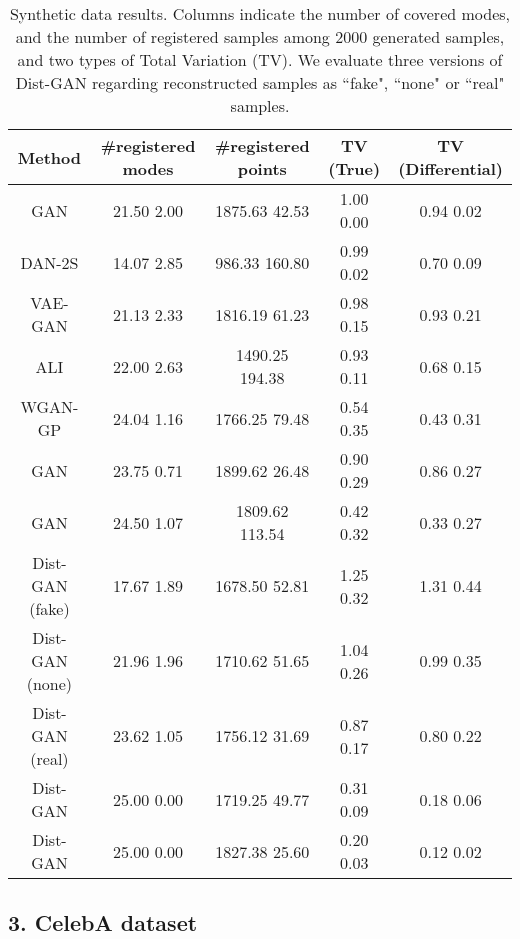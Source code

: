 \documentclass[runningheads]{llncs}
\begin{document}
\begin{table*}
\centering
\footnotesize
\caption{Synthetic data results. Columns indicate the number of covered modes, and the number of registered samples among 2000 generated samples, and two types of Total Variation (TV). We evaluate three versions of Dist-GAN regarding reconstructed samples as ``fake", ``none" or ``real" samples.}
\begin{tabular}{c | c | c | c | c}
Method & \#registered modes & \#registered points & TV (True) & TV (Differential) \\ 
\hline
\hline
GAN \cite{goodfellow-nisp-2014}     & 21.50  2.00     & 1875.63  42.53  & 1.00  0.00 & 0.94  0.02  \\
\hline
DAN-2S \cite{li-arxiv-2017}         & 14.07  2.85     & 986.33  160.80  & 0.99  0.02 & 0.70  0.09 \\
\hline
VAE-GAN \cite{larsen-arxiv-2015} & 21.13  2.33 & 1816.19  61.23 & 0.98  0.15 & 0.93  0.21   \\
\hline
ALI \cite{dumoulin-arxiv-2016}      & 22.00  2.63     & 1490.25  194.38  & 0.93  0.11 & 0.68  0.15  \\
\hline
WGAN-GP \cite{gulrajani-arxiv-2017}   & 24.04  1.16    & 1766.25  79.48   & 0.54  0.35 & 0.43  0.31  \\
\hline
GAN        & 23.75  0.71 & 1899.62  26.48 & 0.90  0.29 & 0.86  0.27 \\
\hline
GAN        & 24.50  1.07 & 1809.62  113.54 & 0.42  0.32 & 0.33  0.27 \\
\hline
Dist-GAN (fake)        &  17.67  1.89 &  1678.50   52.81 &  1.25  0.32 & 1.31   0.44 \\
\hline
Dist-GAN (none)        &  21.96  1.96 &  1710.62  51.65 &  1.04  0.26 &  0.99  0.35 \\
\hline
Dist-GAN (real)        &  23.62  1.05 &  1756.12  31.69 &  0.87  0.17 &  0.80  0.22 \\
\hline
Dist-GAN        & 25.00  0.00 & 1719.25  49.77 & 0.31  0.09 & 0.18  0.06 \\
\hline
Dist-GAN       & 25.00  0.00 & 1827.38  25.60 & 0.20  0.03 & 0.12  0.02\\
\end{tabular}
\label{tbl_toydata_comparison_01}
\end{table*}


\subsection*{3. CelebA dataset}
\end{document}
